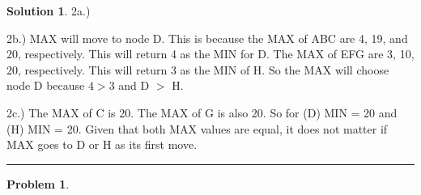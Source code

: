 \documentclass{article}
\theoremstyle{definition}
\newtheorem{problem}{Problem}
\def\fline{\rule{0.75\linewidth}{0.5pt}}
\newcommand{\finishline}{\begin{center}\fline\end{center}}
\newtheorem*{solution*}{Solution}
\newenvironment{solution}{\begin{solution*}}{{\finishline} \end{solution*}}
\begin{document}
\begin{solution}
	\item  2a.) 
		\begin{figure}[h!]
			\centering
		 
		\end{figure}

	\begin{newpage}
	\end{newpage}

	\item 2b.) MAX will move to node D. This is because the MAX of ABC are 4, 19, and 20, respectively. This will return 4 as the MIN for D. The MAX of EFG are 3, 10, 20, respectively. This will return 3 as the MIN of H. So the MAX will choose node D because $4 > 3$ and D $>$ H.

	\item 2c.) The MAX of C is 20. The MAX of G is also 20. So for (D) MIN = 20 and (H) MIN = 20. Given that both MAX values are equal, it does not matter if MAX goes to D or H as its first move.  
	
\end{solution}

\begin{problem} %

\end{problem}
\end{document}
